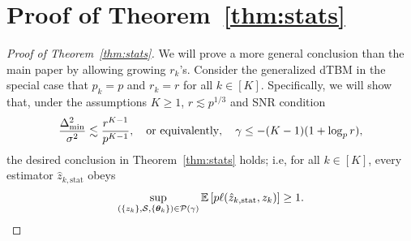 \documentclass[lettersize,journal]{IEEEtran}
\theoremstyle{definition}
\theoremstyle{definition}
\begin{document}
\section*{Proof of Theorem~\ref{thm:stats}}

\begin{proof}[Proof of Theorem~\ref{thm:stats}]
We will prove a more general conclusion than the main paper by allowing growing $r_k$'s. Consider the generalized dTBM in the special case that $p_k = p$ and $r_k = r$ for all $ k\in [K]$. Specifically, we will show that, under 
the assumptions $K\geq 1$, $r\lesssim p^{1/3}$ and SNR condition
\[
{\Delta^2_{\min}\over \sigma^2}\lesssim {r^{K-1}\over p^{K-1}},\quad \text{or equivalently}, \quad \gamma\leq -(K-1)(1+\log_p r),
\]
 the desired conclusion in Theorem~\ref{thm:stats} holds; i.e, for all $k \in [K]$, every estimator $\hat z_{k,\text{stat}}$ obeys
\begin{equation}\label{eq:max}
    \sup_{(\{z_k\}, \tS, \{\mtheta_k\}) \in \tP(\gamma)} \bbE \left[ p\ell(\hat z_{k,\text{stat}}, z_k) \right]\geq 1.
\end{equation}


\end{proof}
\end{document}
